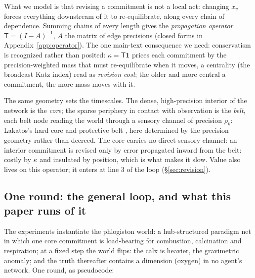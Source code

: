 \documentclass[runningheads]{llncs}
\newcommand{\Top}{\mathsf{T}}          %
\newcommand{\bone}{\mathbf{1}}         %
\begin{document}
What we model is that revising a commitment is not a local act: changing $x_v$ forces
everything downstream of it to re-equilibrate, along every chain of dependence. Summing chains
of every length gives the \emph{propagation operator} $\Top=(I-A)^{-1}$, $A$ the matrix of
edge precisions \citep{wright1934,katz1953,bonacich1987} (closed forms in
Appendix~\ref{app:operator}). The one main-text consequence we need: conservatism is
recognized rather than posited: $\kappa=\Top\bone$ prices each commitment by the
precision-weighted mass that must re-equilibrate when it moves, a centrality (the broadcast
Katz index) read as \emph{revision cost}; the older and more central a commitment, the more
mass moves with it.

The same geometry sets the timescales. The dense, high-precision interior of the network is
the \emph{core}; the sparse periphery in contact with observation is the \emph{belt}, each
belt node reading the world through a sensory channel of precision
$\rho_k$: Lakatos's hard core and protective belt \citep{lakatos1970}, here determined by the
precision geometry rather than decreed. The core carries no direct sensory channel: an
interior commitment is revised only by error propagated inward from the belt: costly by
$\kappa$ and insulated by position, which is what makes it slow. Value also
lives on this operator; it enters at line 3 of the loop (\S\ref{sec:revision}).

\subsection{One round: the general loop, and what this paper runs of it}
\label{sec:model}

The experiments instantiate the phlogiston world: a hub-structured paradigm net in which one
core commitment is load-bearing for combustion, calcination and respiration; at a fixed step
the world flips: the calx is heavier, the gravimetric anomaly; and the truth thereafter
contains a dimension (oxygen) in no agent's network. One round, as
pseudocode:
\end{document}
